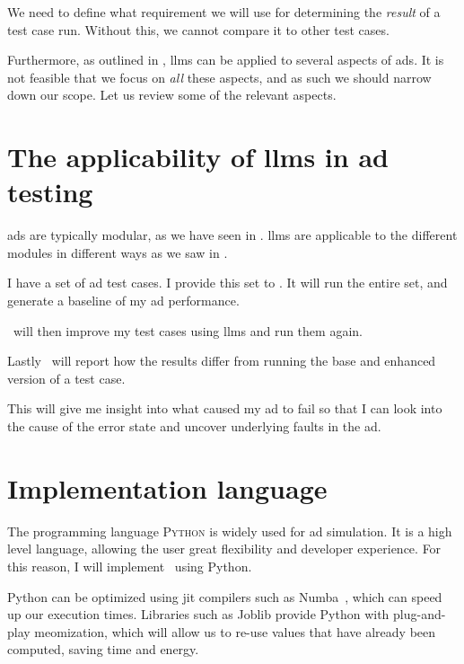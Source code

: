We need to define what requirement we will use for determining the \textit{result} of a test case
run. Without this, we cannot compare it to other test cases.

Furthermore, as outlined in \citeauthor{LLM4AD}, \acrlong{llms} can be applied to several aspects
of \acrlong{ads}. It is not feasible that we focus on \textit{all} these aspects, and as such we
should narrow down our scope. Let us review some of the relevant aspects.

\section*{The applicability of \acrshort{llms} in \acrshort{ad} testing}

\acrlong{ads} are typically modular, as we have seen in .
\acrshort{llms} are applicable to the different modules in different ways as we saw in
.

\begin{tcolorbox}[colback=gray!5!white,colframe=gray!75!black,title=User history
        of using \hefe]\label{user-history}
    I have a set of \acrfull{ad} test cases. I provide this set to \hefe. It will run the entire
    set, and generate a baseline of my \acrshort{ad} performance.

    \hefe~will then improve my test cases using \acrlong{llms} and run them again.

    Lastly \hefe~will report how the results differ from running the base and enhanced version of a
    test case.

    This will give me insight into what caused my \acrshort{ad} to fail so that I can look into the
    cause of the error state and uncover underlying faults in the \acrlong{ad}.

\end{tcolorbox}


\section{Implementation language}

The programming language \textsc{Python} is widely used for \acrfull{ad} simulation. It is a high
level language, allowing the user great flexibility and developer experience. For this reason, I will
implement \hefe~using Python.

Python can be optimized using \acrfull{jit} compilers such as Numba~\cite{numba}, which can speed up
our execution times. Libraries such as Joblib provide Python with plug-and-play
meomization, which will allow us to re-use values that have already been
computed, saving time and energy.

